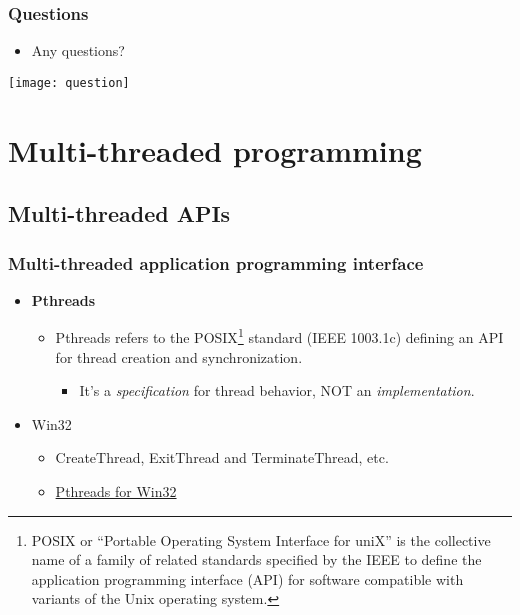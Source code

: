 \documentclass[CJKutf8,dvipsnames,table]{beamer}
\begin{document}
\begin{CJK*}{UTF8}{song}
  \fi

  \begin{frame}
  \frametitle{Questions}
  \begin{itemize}
  \item{Any questions?}
  \end{itemize}
  \begin{center}
    \texttt{[image: question]}
  \end{center}
  \end{frame}

  \fi

  \section{Multi-threaded programming}

\iffalse

  \begin{frame}
  \frametitle{Multi-threaded programming} \pause
  \begin{itemize}
  \item{Application programming interfaces (APIs)} \pause
  \item{Writing multi-threaded code}
  \end{itemize}
  \end{frame}

\fi

  \subsection{Multi-threaded APIs}

  \begin{frame}
  \frametitle{Multi-threaded application programming interface} \pause
  \begin{itemize}
  \item{\textbf{Pthreads}} \pause
    \begin{itemize}
    \item{Pthreads refers to the POSIX\footnote{POSIX or ``Portable Operating System Interface for uniX'' is the collective name of a family of related standards specified by the IEEE to define the application programming interface (API) for software compatible with variants of the Unix operating system.} standard (IEEE 1003.1c) defining an API for thread creation and synchronization.} \pause
      \begin{itemize}
      \item{It's a \emph{specification} for thread behavior, NOT an \emph{implementation}.} \pause
      \end{itemize}
    \end{itemize}
  \item{Win32} \pause
    \begin{itemize}
    \item{CreateThread, ExitThread and TerminateThread, etc.} \pause
    \item{\href{http://sources.redhat.com/pthreads-win32}{Pthreads for Win32}}
    \end{itemize}
  \end{itemize}
  \end{frame}


\end{CJK*}
\end{document}
